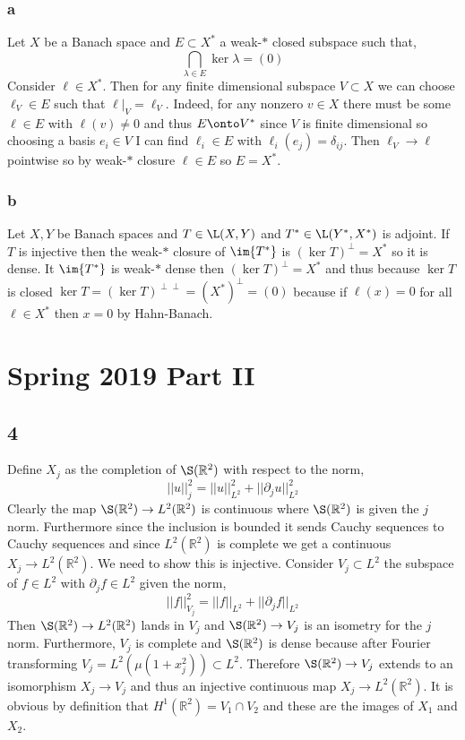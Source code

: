 \documentclass[12pt]{article}
\newcommand{\R}{\mathbb{R}}
\begin{document}
\subsubsection{a}

Let $X$ be a Banach space and $E \subset X^*$ a weak-$*$ closed subspace such that,
\[ \bigcap_{\lambda \in E} \ker{\lambda} = (0) \]
Consider $\ell \in X^*$. Then for any finite dimensional subspace $V \subset X$ we can choose $\ell_V \in E$ such that $\ell|_V = \ell_V$. Indeed, for any nonzero $v \in X$ there must be some $\ell \in E$ with $\ell(v) \neq 0$ and thus $E \onto V^*$ since $V$ is finite dimensional so choosing a basis $e_i \in V$ I can find $\ell_i \in E$ with $\ell_i(e_j) = \delta_{ij}$. Then $\ell_V \to \ell$ pointwise so by weak-$*$ closure $\ell \in E$ so $E = X^*$.

\subsubsection{b}

Let $X, Y$ be Banach spaces and $T \in \L(X, Y)$ and $T^* \in \L(Y^*, X^*)$ is adjoint. If $T$ is injective then the weak-$*$ closure of $\im{T^*}$ is $(\ker{T})^\perp = X^*$ so it is dense. It $\im{T^*}$ is weak-$*$ dense then $(\ker{T})^\perp = X^*$ and thus because $\ker{T}$ is closed $\ker{T} = (\ker{T})^{\perp \perp} = (X^*)^\perp = (0)$ because if $\ell(x) = 0$ for all $\ell \in X^*$ then $x = 0$ by Hahn-Banach. 

\section{Spring 2019 Part II}

\subsection{4}

Define $X_j$ as the completion of $\S(\R^2)$ with respect to the norm,
\[ || u ||_j^2 = || u ||_{L^2}^2  +|| \partial_j u ||^2_{L^2} \]
Clearly the map $\S(\R^2) \to L^2(\R^2)$ is continuous where $\S(\R^2)$ is given the $j$ norm. Furthermore since the inclusion is bounded it sends Cauchy sequences to Cauchy sequences and since $L^2(\R^2)$ is complete we get a continuous $X_j \to L^2(\R^2)$. We need to show this is injective. Consider $V_j \subset L^2$ the subspace of $f \in L^2$ with $\partial_j f \in L^2$ given the norm,
\[ || f ||_{V_j}^2 = || f ||_{L^2} + || \partial_j f ||_{L^2} \]
Then $\S(\R^2) \to L^2(\R^2)$ lands in $V_j$ and $\S(\R^2) \to V_j$ is an isometry for the $j$ norm. Furthermore, $V_j$ is complete and $\S(\R^2)$ is dense because after Fourier transforming $V_j = L^2(\mu (1 + x_j^2)) \subset L^2$. Therefore $\S(\R^2) \to V_j$ extends to an isomorphism $X_j \to V_j$ and thus an injective continuous map $X_j \to L^2(\R^2)$. It is obvious by definition that $H^1(\R^2) = V_1 \cap V_2$ and these are the images of $X_1$ and $X_2$.
\end{document}
